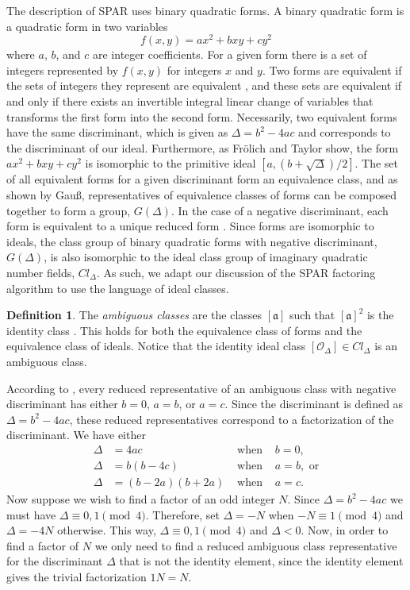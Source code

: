 \documentclass{ucalgthes1}
\theoremstyle{plain}
\theoremstyle{definition}
\newtheorem{defn}[thm]{Definition}
\begin{document}
The description of SPAR uses binary quadratic forms. A binary quadratic form is a quadratic form in two variables
\[
	f(x, y) = ax^2 + bxy + cy^2
\]
where $a$, $b$, and $c$ are integer coefficients.  For a given form there is a set of integers represented by $f(x, y)$ for integers $x$ and $y$. Two forms are equivalent if the sets of integers they represent are equivalent \cite[pp.239-240]{Crandall2001}, and these sets are equivalent if and only if there exists an invertible integral linear change of variables that transforms the first form into the second form. Necessarily, two equivalent forms have the same discriminant, which is given as $\Delta = b^2 - 4ac$ and corresponds to the discriminant of our ideal.  Furthermore, as Fr\"olich and Taylor \cite{Frolich1993} show, the form $ax^2 + bxy + cy^2$ is isomorphic to the primitive ideal $[a, (b + \sqrt\Delta)/2]$.  The set of all equivalent forms for a given discriminant form an equivalence class, and as shown by Gau\ss, representatives of equivalence classes of forms can be composed together to form a group, $G(\Delta)$.  In the case of a negative discriminant, each form is equivalent to a unique reduced form \cite[p.241]{Crandall2001}.  Since forms are isomorphic to ideals, the class group of binary quadratic forms with negative discriminant, $G(\Delta)$, is also isomorphic to the ideal class group of imaginary quadratic number fields, $Cl_\Delta$. As such, we adapt our discussion of the SPAR factoring algorithm to use the language of ideal classes.

\begin{defn}
The \emph{ambiguous classes} are the classes $[\mathfrak a]$ such that ${[\mathfrak a]}^2$ is the identity class \cite{Schnorr1984}.  This holds for both the equivalence class of forms and the equivalence class of ideals.  Notice that the identity ideal class $[\mathcal O_\Delta] \in Cl_\Delta$ is an ambiguous class.
\end{defn}

According to \cite{Schnorr1984}, every reduced representative of an ambiguous class with negative discriminant has either $b = 0$, $a = b$, or $a = c$.  Since the discriminant is defined as $\Delta = b^2 - 4ac$, these reduced representatives correspond to a factorization of the discriminant.  We have either
\begin{align*}
\Delta &= 4ac & \textrm{ when } & b = 0, \\
\Delta &= b(b - 4c) & \textrm{ when } & a = b, \textrm{ or} \\
\Delta &= (b - 2a)(b + 2a) & \textrm{ when } & a = c.
\end{align*}
Now suppose we wish to find a factor of an odd integer $N$. Since $\Delta = b^2 - 4ac$ we must have $\Delta \equiv 0, 1 \pmod 4$.  Therefore, set $\Delta = -N$ when $-N \equiv 1 \pmod 4$ and $\Delta = -4N$ otherwise.  This way, $\Delta \equiv 0, 1 \pmod 4$ and $\Delta < 0$. Now, in order to find a factor of $N$ we only need to find a reduced ambiguous class representative for the discriminant $\Delta$ that is not the identity element, since the identity element gives the trivial factorization $1N=N$.
\end{document}
